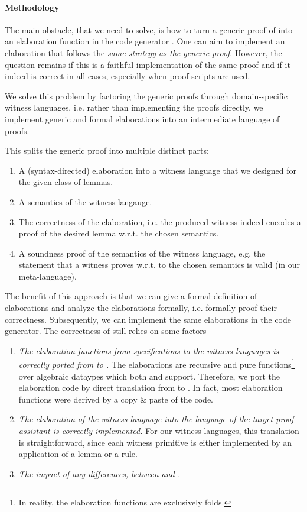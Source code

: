 \paragraph{Methodology}
The main obstacle, that we need to solve, is how to turn a generic proof of
\Yarn into an elaboration function in the code generator \Needle. One can aim to
implement an elaboration that follows the \emph{same strategy as the generic
  proof}. However, the question remains if this is a faithful implementation of
the same proof and if it indeed is correct in all cases, especially when proof
scripts are used.

We solve this problem by factoring the generic proofs through domain-specific
witness languages, i.e. rather than implementing the proofs directly, we
implement generic and formal elaborations into an intermediate language of
proofs.

This splits the generic proof into multiple distinct parts:
\begin{enumerate}
\item A (syntax-directed) elaboration into a witness language that we designed
  for the given class of lemmas.
\item A semantics of the witness langauge.
\item The correctness of the elaboration, i.e. the produced witness indeed
  encodes a proof of the desired lemma w.r.t. the chosen semantics.
\item A soundness proof of the semantics of the witness language, e.g. the
  statement that a witness proves w.r.t. to the chosen semantics is valid (in
  our meta-language).
\end{enumerate}

The benefit of this approach is that we can give a formal definition of
elaborations and analyze the elaborations formally, i.e. formally proof their
correctness. Subsequently, we can implement the same elaborations in the code
generator. The correctness of \Needle still relies on some factors

\begin{enumerate}
\item \emph{The elaboration functions from \Knot specifications to the witness
  languages is correctly ported from \Coq to \Haskell.} The elaborations are
  recursive and pure functions\footnote{In reality, the elaboration functions
    are exclusively folds.} over algebraic dataypes which both \Coq and \Haskell
  support. Therefore, we port the elaboration code by direct translation from
  \Coq to \Haskell. In fact, most \Haskell elaboration functions were derived
  by a copy \& paste of the \Coq code.
\item \emph{The elaboration of the witness language into the language of the
  target proof-assistant is correctly implemented.} For our witness languages,
  this translation is straightforward, since each witness primitive is either
  implemented by an application of a lemma or a rule.
\item \emph{The impact of any differences, between \Needle and \Yarn.}
\end{enumerate}



